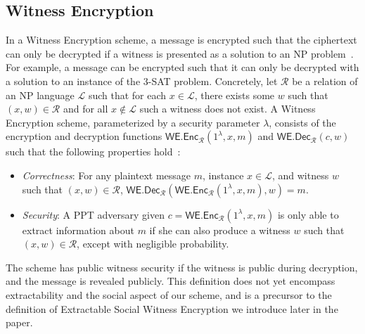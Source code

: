 \subsection{Witness Encryption}
    In a Witness Encryption scheme, a message is encrypted such that the ciphertext can only be decrypted if a witness is presented as a solution to an NP problem~\cite{witness_encryption}.
    For example, a message can be encrypted such that it can only be decrypted with a solution to an instance of the 3-SAT problem.
    Concretely, let $\mathcal{R}$ be a relation of an NP language $\mathcal{L}$ such that for each $x \in \mathcal{L}$, there exists some $w$ such that $(x, w) \in \mathcal{R}$ and for all $x \notin \mathcal{L}$ such a witness does not exist.
    A Witness Encryption scheme, parameterized by a security parameter $\lambda$, consists of the encryption and decryption functions $\textsf{WE.Enc}_\mathcal{R}(1^{\lambda}, x, m)$ and $\textsf{WE.Dec}_\mathcal{R}(c, w)$ such that the following properties hold~\cite{timelock_from_crc}:
    \begin{itemize}
        \item \emph{Correctness}: For any plaintext message $m$, instance $x \in \mathcal{L}$, and witness $w$ such that $(x, w) \in \mathcal{R}$, $\textsf{WE.Dec}_\mathcal{R}(\textsf{WE.Enc}_\mathcal{R}(1^{\lambda}, x, m), w) = m$.
        \item \emph{Security}: A PPT adversary given $c = \textsf{WE.Enc}_\mathcal{R}(1^{\lambda}, x, m)$ is only able to extract information about $m$ if she can also produce a witness $w$ such that $(x, w) \in \mathcal{R}$, except with negligible probability.
    \end{itemize}
    The scheme has public witness security if the witness is public during decryption, and the message is revealed publicly.
    This definition does not yet encompass extractability and the social aspect of our scheme, and is a precursor to the definition of Extractable Social Witness Encryption we introduce later in the paper.